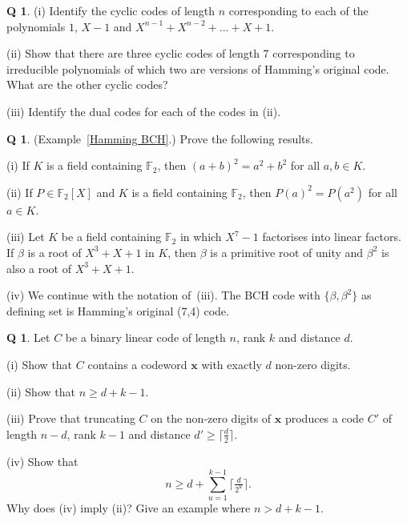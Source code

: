 \documentclass[12pt,a4paper]{article}
\theoremstyle{plain}
\theoremstyle{definition}
\newtheorem{question}[theorem]{Q}
\begin{document}
    \begin{question}
        \label{C3.12}\label{E;Hamming original}
        (i) Identify the cyclic codes of
        length $n$ corresponding to each of the polynomials
        $1$, $X-1$  and $X^{n-1}+X^{n-2}+\dots+X+1$.

        (ii) Show that there are three cyclic codes
        of length 7 corresponding to irreducible
        polynomials of which two are versions of Hamming's
        original code. What are the other cyclic codes?

        (iii) Identify the dual codes for each of the
        codes in (ii).
    \end{question}
    \begin{question}
        \label{C3.13}
        (Example~\ref{Hamming BCH}.)
        Prove the following results.

        (i) If $K$ is a field containing
        ${\mathbb F}_{2}$, then $(a+b)^{2}=a^{2}+b^{2}$
        for all $a,b\in K$.

        (ii) If $P\in {\mathbb F}_{2}[X]$ and $K$ is a field containing
        ${\mathbb F}_{2}$, then $P(a)^{2}=P(a^{2})$
        for all $a\in K$.

        (iii) Let $K$ be a field containing
        ${\mathbb F}_{2}$ in which $X^{7}-1$ factorises
        into linear factors. If $\beta$ is a root of $X^{3}+X+1$
        in $K$, then $\beta$ is a primitive root of unity
        and $\beta^{2}$ is also a root of $X^{3}+X+1$.

        (iv) We continue with the notation of~(iii).
        The BCH
        code with $\{\beta,\beta^{2}\}$ as defining set
        is Hamming's original (7,4) code.
    \end{question}
    \begin{question}
        \label{C3.14} Let $C$ be a binary linear code of length
        $n$, rank $k$ and distance $d$.

        (i) Show that $C$ contains a codeword ${\mathbf x}$ with exactly
        $d$ non-zero digits.

        (ii) Show that $n\geq d+k-1$.

        (iii) Prove that truncating $C$ on the non-zero
        digits of ${\mathbf x}$ produces a code
        $C'$ of length $n-d$, rank $k-1$ and distance
        $d'\geq\lceil \tfrac{d}{2}\rceil$.

        \noindent[Hint: To show $d'\geq\lceil \tfrac{d}{2}\rceil$,
        consider, for ${\mathbf y}\in C$, the coordinates
        where $x_{j}=y_{j}$ and the coordinates
        where $x_{j}\neq y_{j}$.]

        (iv) Show that
        \[n\geq d+\sum_{u=1}^{k-1}\lceil \tfrac{d}{2^{u}}\rceil.\]
        Why does (iv) imply (ii)? Give an example where
        $n>d+k-1$.
    \end{question}
\end{document}
